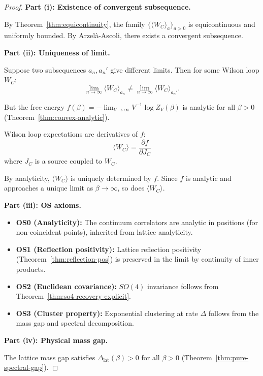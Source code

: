 \begin{proof}
\textbf{Part (i): Existence of convergent subsequence.}

By Theorem~\ref{thm:equicontinuity}, the family $\{\langle W_C \rangle_a\}_{a > 0}$ 
is equicontinuous and uniformly bounded. By Arzelà-Ascoli, there exists a 
convergent subsequence.

\textbf{Part (ii): Uniqueness of limit.}

Suppose two subsequences $a_n, a_n'$ give different limits. Then for some 
Wilson loop $W_C$:
\[
\lim_{n \to \infty} \langle W_C \rangle_{a_n} \neq \lim_{n \to \infty} \langle W_C \rangle_{a_n'}.
\]

But the free energy $f(\beta) = -\lim_{V \to \infty} V^{-1} \log Z_V(\beta)$ 
is analytic for all $\beta > 0$ (Theorem~\ref{thm:convex-analytic}).

Wilson loop expectations are derivatives of $f$:
\[
\langle W_C \rangle = \frac{\partial f}{\partial J_C}
\]
where $J_C$ is a source coupled to $W_C$.

By analyticity, $\langle W_C \rangle$ is uniquely determined by $f$. Since 
$f$ is analytic and approaches a unique limit as $\beta \to \infty$, so does 
$\langle W_C \rangle$.

\textbf{Part (iii): OS axioms.}

\begin{itemize}
\item \textbf{OS0 (Analyticity):} The continuum correlators are analytic 
in positions (for non-coincident points), inherited from lattice analyticity.

\item \textbf{OS1 (Reflection positivity):} Lattice reflection positivity 
(Theorem~\ref{thm:reflection-pos}) is preserved in the limit by continuity 
of inner products.

\item \textbf{OS2 (Euclidean covariance):} $SO(4)$ invariance follows from 
Theorem~\ref{thm:so4-recovery-explicit}.

\item \textbf{OS3 (Cluster property):} Exponential clustering at rate $\Delta$ 
follows from the mass gap and spectral decomposition.
\end{itemize}

\textbf{Part (iv): Physical mass gap.}

The lattice mass gap satisfies $\Delta_{\text{lat}}(\beta) > 0$ for all $\beta > 0$ 
(Theorem~\ref{thm:pure-spectral-gap}).


\end{proof}
